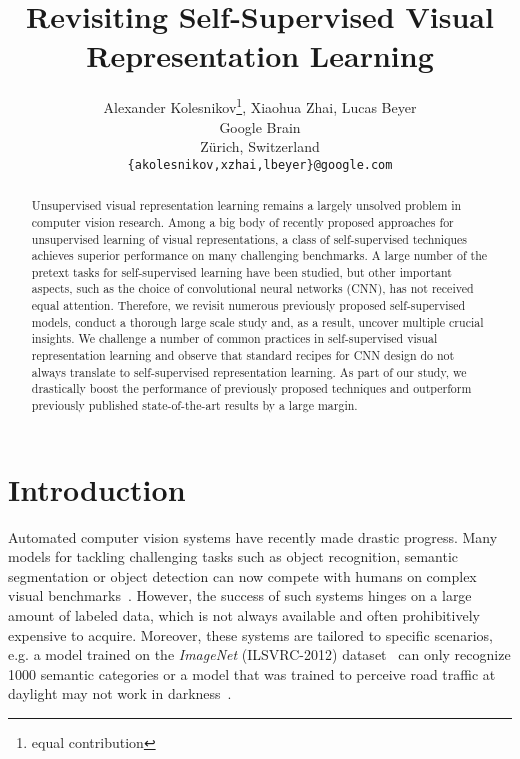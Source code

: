 \documentclass[10pt,twocolumn,letterpaper]{article}
\begin{document}
\title{Revisiting Self-Supervised Visual Representation Learning}

\author{Alexander Kolesnikov\thanks{equal contribution}, Xiaohua Zhai\footnotemark[1], Lucas Beyer\footnotemark[1]\\
Google Brain\\
Z\"urich, Switzerland\\
{\tt\small \{akolesnikov,xzhai,lbeyer\}@google.com}
}

\maketitle

\begin{abstract}


Unsupervised visual representation learning remains a largely unsolved problem
in computer vision research.
Among a big body of recently proposed approaches for unsupervised learning of visual representations, a class of self-supervised techniques achieves superior performance on many challenging benchmarks.
A large number of the pretext tasks for self-supervised learning have been studied, but other important aspects, such as the choice of convolutional neural networks (CNN), has not received equal attention.
Therefore, we revisit numerous previously proposed self-supervised models, conduct a thorough large scale study and, as a result, uncover multiple crucial insights.
We challenge a number of common practices in self-supervised visual representation learning and observe that standard recipes for CNN design do not always translate to self-supervised representation learning.
As part of our study, we drastically boost the performance of previously proposed techniques and outperform previously published state-of-the-art results by a large margin.


\end{abstract}

\section{Introduction}\label{sec:intro}

Automated computer vision systems have recently made drastic progress.
Many models for tackling challenging tasks such as object recognition,
semantic segmentation or object detection can now compete with humans
on complex visual benchmarks~\cite{he2015delving,xie2017aggregated,he2017mask}.
However, the success of such systems hinges on a large
amount of labeled data, which is not always available and
often prohibitively expensive to acquire.
Moreover, these systems are tailored to specific scenarios, e.g. a model trained on the \emph{ImageNet} (ILSVRC-2012) dataset~\cite{russakovsky2015imagenet} can only recognize 1000 semantic categories or a model that was trained to perceive road traffic at daylight may not work in darkness~\cite{dai2018dark,chen2018domain}.
\end{document}
